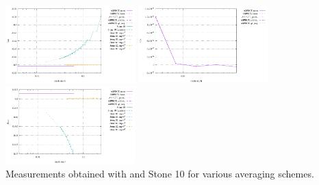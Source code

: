\begin{center}
\includegraphics[width=5cm]{images/stokes_sphere3D/pressure_min_NS}
\includegraphics[width=5cm]{images/stokes_sphere3D/pressure_mean_NS}
\includegraphics[width=5cm]{images/stokes_sphere3D/pressure_max_NS}\\
{\captionfont Measurements obtained with \aspect and Stone 10 for various averaging schemes.}
\end{center}

